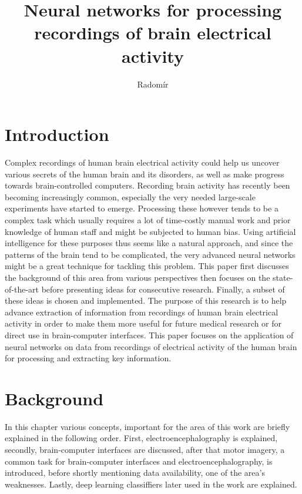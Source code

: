 \documentclass[english, he, bc, kiv, iso690alph, viewonly]{fasthesis}
\author{Radomír}{Kesl}{}{}
\title{Neural networks for processing recordings of brain electrical activity}
\begin{document}
\frontpages[tm]
\tableofcontents


\chapter{Introduction}

Complex recordings of human brain electrical activity could help us uncover various secrets of the human brain and its disorders, as well as make progress towards brain-controlled computers.
Recording brain activity has recently been becoming increasingly common, especially the very needed large-scale experiments have started to emerge. Processing these however tends to be a complex task which usually requires a lot of time-costly manual work and prior knowledge of human staff and might be subjected to human bias. Using artificial intelligence for these purposes thus seems like a natural approach, and since the patterns of the brain tend to be complicated, the very advanced neural networks might be a great technique for tackling this problem.
This paper first discusses the background of this area from various perspectives then focuses on the state-of-the-art before presenting ideas for consecutive research. Finally, a subset of these ideas is chosen and implemented.
The purpose of this research is to help advance extraction of information from recordings of human brain electrical activity in order to make them more useful  for future medical research or for direct use in brain-computer interfaces.
This paper focuses on the application of neural networks on data from recordings of electrical activity of the human brain for processing and extracting key information.


\chapter{Background}

In this chapter various concepts, important for the area of this work are briefly explained in the following order. First, electroencephalography is explained, secondly, brain-computer interfaces are discussed, after that motor imagery, a common task for brain-computer interfaces and electroencephalography, is introduced, before shortly mentioning data availability, one of the area's weaknesses. Lastly, deep learning classiffiers later used in the work are explained.
\end{document}
